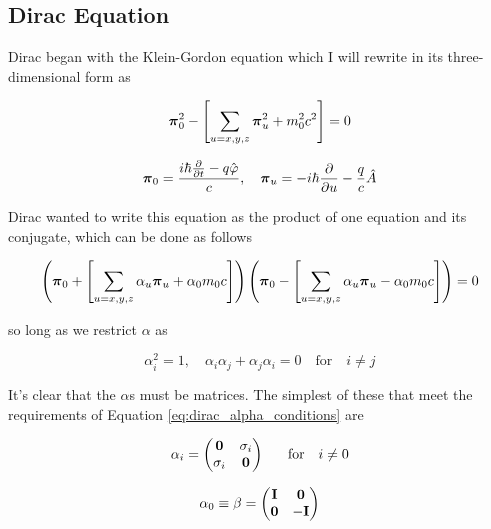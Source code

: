 \subsection{Dirac Equation}

Dirac\cite{Dirac610} began with the Klein-Gordon equation which I will rewrite in its three-dimensional form as

\begin{equation}
\label{eq:dirac_3D}
{\bf{\pi}}_{0}^{2} - \left[\sum_{u=x,y,z}{\bf{\pi}}_{u}^{2} + m_{0}^{2}c^{2}\right] = 0
\end{equation}

\begin{equation}
\label{eq:dirac_3D_def}
{\bf{\pi}}_{0} = \frac{i\hbar\frac{\partial}{\partial t} -q\hat{\varphi}}{c}, \quad {\bf{\pi}}_{u} = -i\hbar\frac{\partial}{\partial u} - \frac{q}{c}\hat{A}
\end{equation}

Dirac wanted to write this equation as the product of one equation and its conjugate, which can be done as follows

\begin{equation}
\label{eq:dirac_3D_conj}
\left({\bf{\pi}}_{0} + \left[\sum_{u=x,y,z}\alpha_{u}{\bf{\pi}}_{u} + \alpha_{0}m_{0}c\right]\right)\left({\bf{\pi}}_{0} - \left[\sum_{u=x,y,z}\alpha_{u}{\bf{\pi}}_{u} - \alpha_{0}m_{0}c\right]\right) = 0
\end{equation}

so long as we restrict $\alpha$ as

\begin{equation}
\label{eq:dirac_alpha_conditions}
\alpha^{2}_{i} = 1, \quad \alpha_{i}\alpha_{j} + \alpha_{j}\alpha_{i} = 0 \quad \text{for} \quad i \neq j
\end{equation}

It's clear that the $\alpha$s must be matrices. The simplest of these that meet the requirements of Equation \ref{eq:dirac_alpha_conditions} are

\begin{equation}
\label{eq:dirac_alpha_matrix}
\alpha_{i} = 
\begin{pmatrix}
{\bf{0}}	&	\sigma_{i}	\\
\sigma_{i}	&	{\bf{0}}	\\
\end{pmatrix} 
\quad \text{for} \quad i \neq 0
\end{equation}

\begin{equation}
\label{eq:dirac_beta_matrix}
\alpha_{0} \equiv \beta = 
\begin{pmatrix}
{\bf{I}}	&	{\bf{0}}	\\
{\bf{0}}	&	-{\bf{I}}	\\
\end{pmatrix} 
\end{equation}

